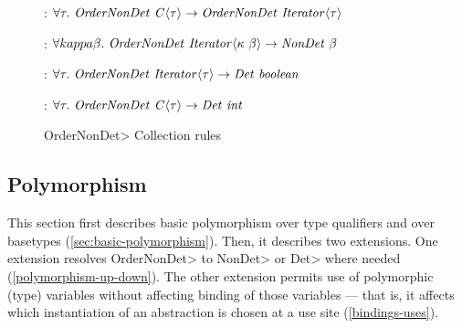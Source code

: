 \begin{figure}

    : 
    $
    \forallt{\tau} \|OrderNonDet \ C| \angles{\tau} \rightarrow 
    \|OrderNonDet \ Iterator| \angles{\tau}
    $
    
    \bigskip
    

    :
    $
    \forallt{kappa \beta} \|OrderNonDet \ Iterator|\angles{\kappa \ \beta} \rightarrow
    \|NonDet|\ \beta
    $
    
    \bigskip
    

    :
    $
    \forallt{\tau} \|OrderNonDet \ Iterator|\angles{\tau} \rightarrow
    \|Det \ boolean|
    $
    \bigskip


    :
    $
    \forallt{\tau} \|OrderNonDet \ C|\angles{\tau} \rightarrow
    \|Det \ int|
    $
    
\caption{\<OrderNonDet> Collection rules}
\label{fig-ordernondet-rules}
\end{figure}

\subsection{Polymorphism}\label{polymorphism}

This section first describes basic polymorphism over type qualifiers and
over basetypes (\cref{sec:basic-polymorphism}).  Then, it describes two
extensions.
One extension resolves \<OrderNonDet> to \<NonDet> or \<Det> where
needed (\cref{polymorphism-up-down}).
The other extension permits use of polymorphic (type) variables without
affecting binding of those variables --- that is, it affects which
instantiation of an abstraction is chosen at a use site 
(\cref{bindings-uses}).

